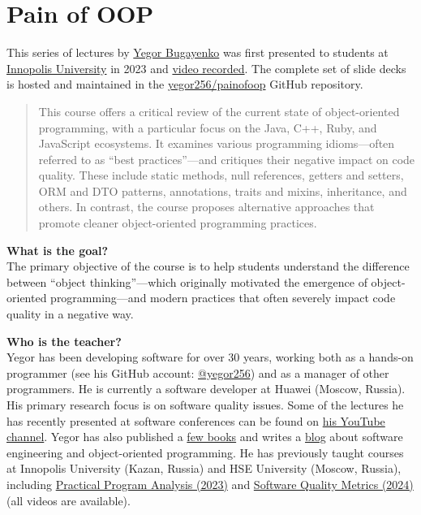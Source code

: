 \documentclass[nobrand,anonymous,nodate,nosecurity]{huawei}
\begin{document}


\section*{Pain of OOP}

This series of lectures by \href{https://www.yegor256.com}{Yegor Bugayenko} was first presented to students at \href{https://innopolis.university/en/}{Innopolis University} in 2023 and \href{https://www.youtube.com/playlist?list=PLaIsQH4uc08ytf8POIIAkkR4ZsRq8DFiV}{video recorded}.
The complete set of slide decks is hosted and maintained in the \href{https://github.com/yegor256/painofoop}{yegor256/painofoop} GitHub repository.

\begin{abstract}
This course offers a critical review of the current state of object-oriented programming, with a particular focus on the Java, C++, Ruby, and JavaScript ecosystems.
It examines various programming idioms—often referred to as ``best practices''---and critiques their negative impact on code quality.
These include static methods, null references, getters and setters, ORM and DTO patterns, annotations, traits and mixins, inheritance, and others.
In contrast, the course proposes alternative approaches that promote cleaner object-oriented programming practices.
\end{abstract}

\textbf{What is the goal?}\\
The primary objective of the course is to help students understand the difference between ``object thinking''---which originally motivated the emergence of object-oriented programming---and modern practices that often severely impact code quality in a negative way.

\textbf{Who is the teacher?}\\
Yegor has been developing software for over 30 years, working both as a hands-on programmer (see his GitHub account: \href{https://github.com/yegor256}{@yegor256}) and as a manager of other programmers.
He is currently a software developer at Huawei (Moscow, Russia).
His primary research focus is on software quality issues.
Some of the lectures he has recently presented at software conferences can be found on \href{https://www.youtube.com/channel/UCr9qCdqXLm2SU0BIs6d_68Q}{his YouTube channel}.
Yegor has also published a \href{https://www.yegor256.com/books.html}{few books} and writes a \href{https://www.yegor256.com/contents.html}{blog} about software engineering and object-oriented programming.
He has previously taught courses at Innopolis University (Kazan, Russia) and HSE University (Moscow, Russia), including \href{https://github.com/yegor256/ppa}{Practical Program Analysis (2023)} and \href{https://github.com/yegor256/sqm}{Software Quality Metrics (2024)} (all videos are available).
\end{document}
